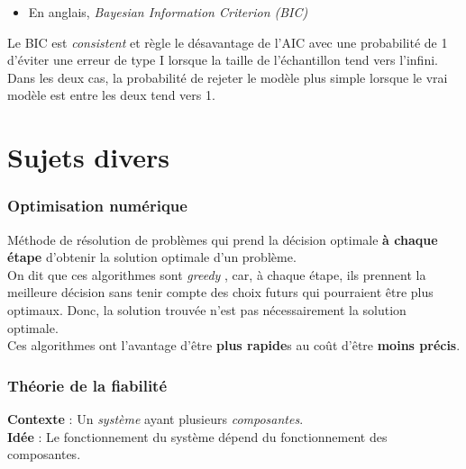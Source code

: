 \documentclass[10pt, french]{article}
\begin{document}
\begin{multicols*}{2}
\begin{definitionNOHFILLsub}
\begin{itemize}
	\item	En anglais, \og \textit{Bayesian Information Criterion (BIC)} \fg{}
\end{itemize}
\end{definitionNOHFILLsub}

Le BIC est \og \textit{consistent} \fg{} et règle le désavantage de l'AIC avec une probabilité de 1 d'éviter une erreur de type I lorsque la taille de l'échantillon tend vers l'infini. \\

Dans les deux cas, la probabilité de rejeter le modèle plus simple lorsque le vrai modèle est entre les deux tend vers 1. 


\pagebreak
\part{Sujets divers}
\label{chapt:varia}
\section{Optimisation numérique}
\begin{definitionNOHFILLsub}
Méthode de résolution de problèmes qui prend la décision optimale \textbf{à chaque étape} d'obtenir la solution optimale d'un problème. \\

On dit que ces algorithmes sont \og \textit{greedy} \fg{}, car, à chaque étape, ils prennent la meilleure décision sans tenir compte des choix futurs qui pourraient être plus optimaux. Donc, la solution trouvée n'est pas nécessairement la solution optimale. \\

Ces algorithmes ont l'avantage d'être \textbf{plus rapide}s au coût d'être \textbf{moins précis}.
\end{definitionNOHFILLsub}



\pagebreak
\section{Théorie de la fiabilité}
\label{sec:reliability}
\begin{definitionNOHFILL}
\textbf{Contexte} : Un \textit{système} ayant plusieurs \textit{composantes}.	 \\
\textbf{Idée} : Le fonctionnement du système dépend du fonctionnement des composantes.


\end{definitionNOHFILL}
\end{multicols*}
\end{document}
